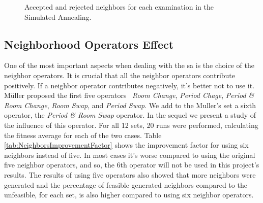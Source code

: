 \begin{figure}[t!]
\centering

\caption{Accepted and rejected neighbors for each examination in the Simulated Annealing.} 
\label{fig:AvsRNeighbors}

\end{figure}
\subsection{Neighborhood Operators Effect}
One of the most important aspects when dealing with the \gls{sa} is the choice of the neighbor operators. It is crucial that all the neighbor operators contribute positively. If a neighbor operator contributes negatively, it's better not to use it. M\"{u}ller proposed the first five operators~\cite{Mueller2009} \textit{Room Change}, \textit{Period Chage}, \textit{Period \& Room Change}, \textit{Room Swap}, and \textit{Period Swap}. We add to the Muller's set a sixth operator, the \textit{Period \& Room Swap} operator. In the sequel we present a study of the influence of this operator. For all 12 sets, 20 runs were performed, calculating the fitness average for each of the two cases. Table \ref{tab:NeighborsImprovementFactor} shows the improvement factor for using six neighbors instead of five. In most cases it's worse compared to using the original five neighbor operators, and so, the 6th operator will not be used in this project's results. The results of using five operators also showed that more neighbors were generated and the percentage of feasible generated neighbors compared to the unfeasible, for each set, is also higher compared to using six neighbor operators.


